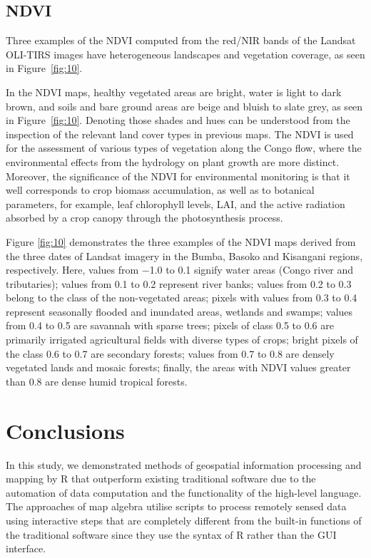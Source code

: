 \documentclass[applsci,article,accept,pdftex,moreauthors]{Definitions/mdpi}
\begin{document}
\subsection{NDVI}

Three examples of the NDVI computed from the red/NIR bands of the Landsat OLI-TIRS images have heterogeneous landscapes and vegetation coverage, as seen in Figure~\ref{fig:10}. 



In the NDVI maps, healthy vegetated areas are bright, water is light to dark brown, and soils and bare ground areas are beige and bluish to slate grey, as seen in Figure~\ref{fig:10}. Denoting those shades and hues can be understood from the inspection of the relevant land cover types in previous maps. The NDVI is used for the assessment of various types of vegetation along the Congo flow, where the environmental effects from the hydrology on plant growth are more distinct. Moreover, the significance of the NDVI for environmental monitoring is that it well corresponds to crop biomass accumulation, as well as to botanical parameters, for example, leaf chlorophyll levels, LAI, and the active radiation absorbed by a crop canopy through the photosynthesis process. 

Figure \ref{fig:10} demonstrates the three examples of the NDVI maps derived from the three dates of Landsat imagery in the Bumba, Basoko and Kisangani regions, respectively. Here, values from $-$1.0 to 0.1 signify water areas (Congo river and tributaries); values from 0.1 to 0.2 represent river banks; values from 0.2 to 0.3 belong to the class of the non-vegetated areas; pixels with values from 0.3 to 0.4 represent seasonally flooded and inundated areas, wetlands and swamps; values from 0.4 to 0.5 are savannah with sparse trees; pixels of class 0.5 to 0.6 are primarily irrigated agricultural fields with diverse types of crops; bright pixels of the class 0.6 to 0.7 are secondary forests; values from 0.7 to 0.8 are densely vegetated lands and mosaic forests; finally, the areas with NDVI values greater than 0.8 are dense humid tropical forests. 

\section{Conclusions}
In this study, we demonstrated methods of geospatial information processing and mapping by R that outperform existing traditional software due to the automation of data computation {and} the functionality of {the} high-level language. The approaches of map algebra utilise scripts to process remotely sensed data using interactive steps that are completely different from the built-in functions of the traditional software since they use the syntax of R rather {than} the GUI interface. 
\end{document}
